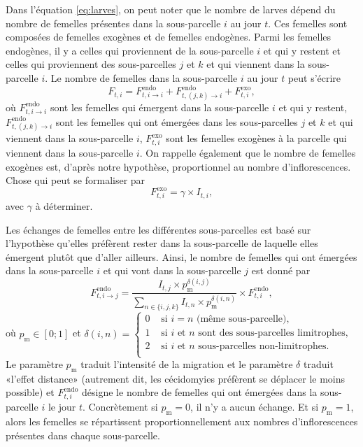 Dans l'équation \ref{eq:larves}, on peut noter que le nombre de larves dépend du nombre de femelles présentes dans la sous-parcelle $i$ au jour $t$.
Ces femelles sont composées de femelles exogènes et de femelles endogènes.
Parmi les femelles endogènes, il y a celles qui proviennent de la sous-parcelle $i$ et qui y restent et celles qui proviennent des sous-parcelles $j$ et $k$ et qui viennent dans la sous-parcelle $i$.
Le nombre de femelles dans la sous-parcelle $i$ au jour $t$ peut s'écrire
\[
F_{t, i} = F^{\text{endo}}_{t, i\rightarrow i} + F^{\text{endo}}_{t, (j,k)\rightarrow i} + F^{\text{exo}}_{t, i}\!,
\]
où $F^{\text{endo}}_{t, i\rightarrow i}$ sont les femelles qui émergent dans la sous-parcelle $i$ et qui y restent, $F^{\text{endo}}_{t, (j,k)\rightarrow i}$ sont les femelles qui ont émergées dans les sous-parcelles $j$ et $k$ et qui viennent dans la sous-parcelle $i$, $F^{\text{exo}}_{t, i}$ sont les femelles exogènes à la parcelle qui viennent dans la sous-parcelle $i$.
On rappelle également que le nombre de femelles exogènes est, d'après notre hypothèse, proportionnel au nombre d'inflorescences. Chose qui peut se formaliser par
\[
F^{\text{exo}}_{t, i} = \gamma \times I_{t, i},
\]
avec $\gamma$ à déterminer.

Les échanges de femelles entre les différentes sous-parcelles est basé sur l'hypothèse qu'elles préfèrent rester dans la sous-parcelle de laquelle elles émergent plutôt que d'aller ailleurs.
Ainsi, le nombre de femelles qui ont émergées dans la sous-parcelle $i$ et qui vont dans la sous-parcelle $j$ est donné par
\[
F_{t, i \rightarrow j}^{\text{endo}} = \frac{I_{t, j} \times p_{\text{m}}^{\delta(i, j)}}{\sum_{n\in \{i,j,k\}} I_{t, n} \times p_{\text{m}}^{\delta(i, n)}}\times F_{t, i}^{\text{endo}},
\]
où $p_{\text{m}} \in [0; 1]$ et $\delta(i, n) =
\begin{cases}
0 & \text{ si } i=n \text{ (même sous-parcelle),}\\
1 & \text{ si $i$ et $n$ sont des sous-parcelles limitrophes,}\\
2 & \text{ si $i$ et $n$ sous-parcelles non-limitrophes.}\\
\end{cases}$\\
Le paramètre $p_{\text{m}}$ traduit l'intensité de la migration et le paramètre $\delta$ traduit «l'effet distance» (autrement dit, les cécidomyies préfèrent se déplacer le moins possible) et $F_{t, i}^{\text{endo}}$ désigne le nombre de femelles qui ont émergées dans la sous-parcelle $i$ le jour $t$.
Concrètement si $p_{\text{m}} = 0$, il n'y a aucun échange.
Et si $p_{\text{m}} = 1$, alors les femelles se répartissent proportionnellement aux nombres d'inflorescences présentes dans chaque sous-parcelle.

